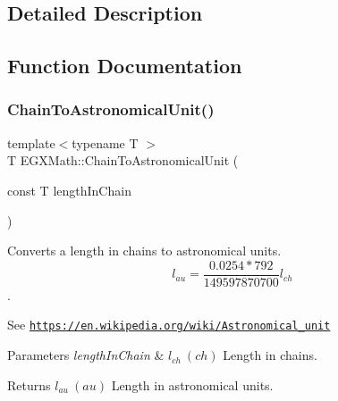 \subsection{Detailed Description}


\subsection{Function Documentation}
\mbox{\label{group___e_g_x_math-_conversions-_length_conversions-_surveyors-_chain-_astronomical_ga5fd3b01f376172581a8847b593d33466}} 
\subsubsection{\texorpdfstring{Chain\+To\+Astronomical\+Unit()}{ChainToAstronomicalUnit()}}
{\footnotesize\ttfamily template$<$typename T $>$ \\
T E\+G\+X\+Math\+::\+Chain\+To\+Astronomical\+Unit (\begin{DoxyParamCaption}\item[{const T}]{length\+In\+Chain }\end{DoxyParamCaption})}



Converts a length in chains to astronomical units. \[ l_{au}=\frac{0.0254 * 792}{149597870700} l_{ch} \]. 

See \href{https://en.wikipedia.org/wiki/Astronomical_unit}{\tt https\+://en.\+wikipedia.\+org/wiki/\+Astronomical\+\_\+unit} 
\begin{DoxyParams}{Parameters}
{\em length\+In\+Chain} & $ l_{ch}\ (ch)$ Length in chains. \\
\hline
\end{DoxyParams}
\begin{DoxyReturn}{Returns}
$ l_{au}\ (au)$ Length in astronomical units. 
\end{DoxyReturn}
\mbox{\label{group___e_g_x_math-_conversions-_length_conversions-_surveyors-_chain-_astronomical_ga0414df8660b7f8fd74f32b0d88c3476f}} 
